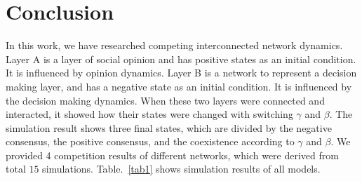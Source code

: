 \documentclass[english]{cccconf}
\begin{document}
\section{Conclusion}
In this work, we have researched competing interconnected network dynamics. Layer A is a layer of social opinion and has positive states as an initial condition. It is influenced by opinion dynamics. Layer B is a network to represent a decision making layer, and has a negative state as an initial condition. It is influenced by the decision making dynamics. When these two layers were connected and interacted, it showed how their states were changed with switching $\gamma$ and $\beta$. The simulation result shows three final states, which are divided by the negative consensus, the positive consensus, and the coexistence according to $\gamma$ and $\beta$. We provided 4 competition results of different networks, which were derived from total $15$ simulations. Table.~\ref{tab1} shows simulation results of all models. 
\end{document}
